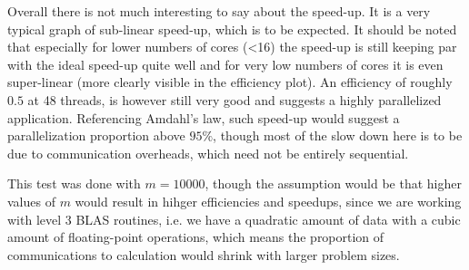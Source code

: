\documentclass{scrartcl}
\begin{document}
Overall there is not much interesting to say about the speed-up. 
It is a very typical graph of sub-linear speed-up, which is to be expected.
It should be noted that especially for lower numbers of cores (<16) the speed-up is still keeping par with the ideal speed-up quite well and for very low numbers of cores it is even super-linear (more clearly visible in the efficiency plot).
An efficiency of roughly $0.5$ at 48 threads, is however still very good and suggests a highly parallelized application.
Referencing Amdahl's law, such speed-up would suggest a parallelization proportion above $95\%$, though most of the slow down here is to be due to communication overheads, which need not be entirely sequential.

This test was done with $m=10000$, though the assumption would be that higher values of $m$ would result in hihger efficiencies and speedups, since we are working with level 3 BLAS routines, i.e. we have a quadratic amount of data with a cubic amount of floating-point operations, which means the proportion of communications to calculation would shrink with larger problem sizes.
\end{document}
